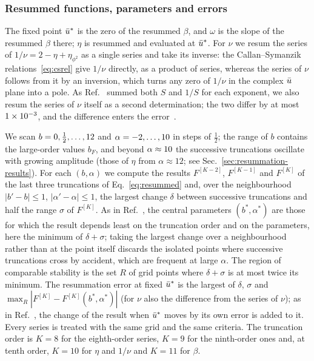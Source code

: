 \subsubsection{Resummed functions, parameters and errors}
\label{sec:resummation-criteria}

The fixed point $\bar u^*$ is the zero of the resummed $\beta$, and $\omega$ is the slope of the resummed $\beta$ there;
$\eta$ is resummed and evaluated at $\bar u^*$. For $\nu$ we resum the series of $1/\nu=2-\eta+\eta_{\phi^2}$ as a
single series and take its inverse: the Callan--Symanzik relations~\eqref{eq:csrel} give $1/\nu$ directly, as a
product of series, whereas the series of $\nu$ follows from it by an inversion, which turns any zero of $1/\nu$ in the
complex $\bar u$ plane into a pole. As Ref.~\cite{GuidaZinnJustin1998} summed both $S$ and $1/S$ for each exponent,
we also resum the series of $\nu$ itself as a second determination; the two differ by at most $1\times10^{-3}$, and the
difference enters the error~.

We scan $b=0,\frac12,\dots,12$ and $\alpha=-2,\dots,10$ in steps of $\frac12$; the range of $b$
contains the large-order values $b_F$, and beyond $\alpha\approx10$ the successive truncations oscillate with
growing amplitude (those of $\eta$ from $\alpha\approx12$; see Sec.~\ref{sec:resummation-results}). For each
$(b,\alpha)$ we compute the results $F^{[K-2]}$, $F^{[K-1]}$ and $F^{[K]}$ of the last three truncations of
Eq.~\eqref{eq:resummed} and, over the neighbourhood $|b'-b|\le1$, $|\alpha'-\alpha|\le1$,
the largest change $\delta$ between successive truncations and half the range $\sigma$ of $F^{[K]}$. As in
Ref.~\cite{GuidaZinnJustin1998}, the central parameters $(b^*,\alpha^*)$ are those for which the result depends least
on the truncation order and on the parameters, here the minimum of $\delta+\sigma$; taking the largest change over a
neighbourhood rather than at the point itself discards the isolated points where successive truncations cross by
accident, which are frequent at large $\alpha$. The region of comparable stability is the set $R$ of grid points
where $\delta+\sigma$ is at most twice its minimum. The resummation error at fixed $\bar u^*$ is the largest of
$\delta$, $\sigma$ and $\max_R|F^{[K]}-F^{[K]}(b^*,\alpha^*)|$ (for $\nu$ also the difference from the series of $\nu$); as in
Ref.~\cite{GuidaZinnJustin1998}, the change of the result when $\bar u^*$ moves by its own error is added to it. Every
series is treated with the same grid and the same criteria. The truncation order is $K=8$ for the eighth-order series,
$K=9$ for the ninth-order ones and, at tenth order, $K=10$ for $\eta$ and $1/\nu$ and $K=11$ for $\beta$.

